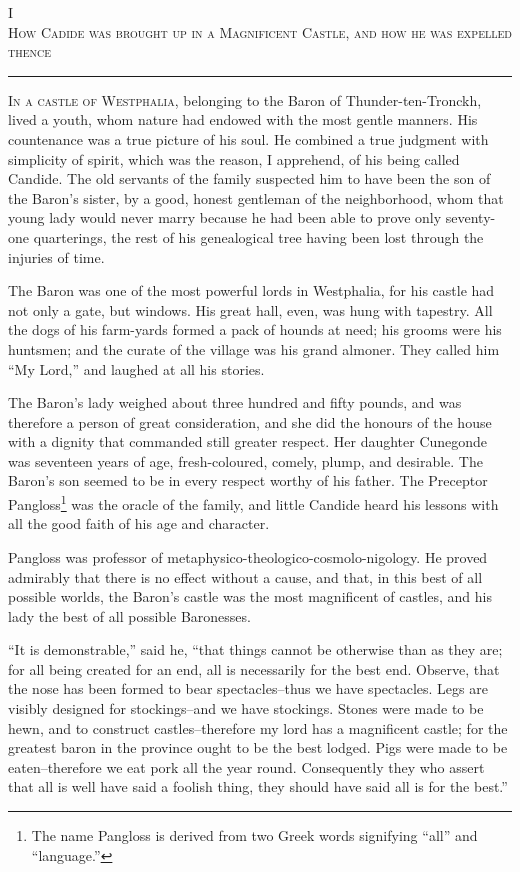 \begin{center}
I \\
\textsc{How Cadide was brought up in a Magnificent Castle, and how he was expelled thence}
\end{center}
\vspace{-.7cm}
\rule{\textwidth}{0.5pt}
\thispagestyle{pter}
\lettrine{I}{n a castle of Westphalia}, belonging to the Baron of Thunder-ten-Tronckh, lived a youth, whom nature had endowed with the most gentle manners. His countenance was a true picture of his soul. He 
combined a true judgment with simplicity of spirit, which was the reason, I apprehend, of his being called Candide. The old servants of the family suspected him to have been the son of the Baron's sister, by a good, honest gentleman of the neighborhood, whom that young lady would never marry because he had been able to prove only seventy-one quarterings, the rest of his genealogical tree having been lost through the injuries of time.

The Baron was one of the most powerful lords in Westphalia, for his castle had not only a gate, but windows. His great hall, even, was hung with tapestry. All the dogs of his farm-yards formed a pack of hounds at need; his grooms were his huntsmen; and the curate of the village was his grand almoner. They called him ``My Lord,'' and laughed at all his stories.

The Baron's lady weighed about three hundred and fifty pounds, and was therefore a person of great consideration, and she did the honours of the house with a dignity that commanded still greater respect. Her daughter Cunegonde was seventeen years of age, fresh-coloured, comely, plump, and desirable. The Baron's son seemed to be in every respect worthy of his father. The Preceptor Pangloss\footnote{The name Pangloss is derived from two Greek words signifying ``all'' and ``language.''} was the oracle of the family, and little Candide heard his lessons with all the good faith of his age and character.

Pangloss was professor of metaphysico-theologico-cosmolo-nigology. He proved admirably that there is no effect without a cause, and that, in this best of all possible worlds, the Baron's castle was the most magnificent of castles, and his lady the best of all possible Baronesses.

``It is demonstrable,'' said he, ``that things cannot be otherwise than as they are; for all being created for an end, all is necessarily for the best end. Observe, that the nose has been formed to bear spectacles--thus we have spectacles. Legs are visibly designed for stockings--and we have stockings. Stones were made to be hewn, and to construct castles--therefore my lord has a magnificent castle; for the greatest baron in the province ought to be the best lodged. Pigs were made to be eaten--therefore we eat pork all the year round. Consequently they who assert that all is well have said a foolish thing, they should have said all is for the best.''

